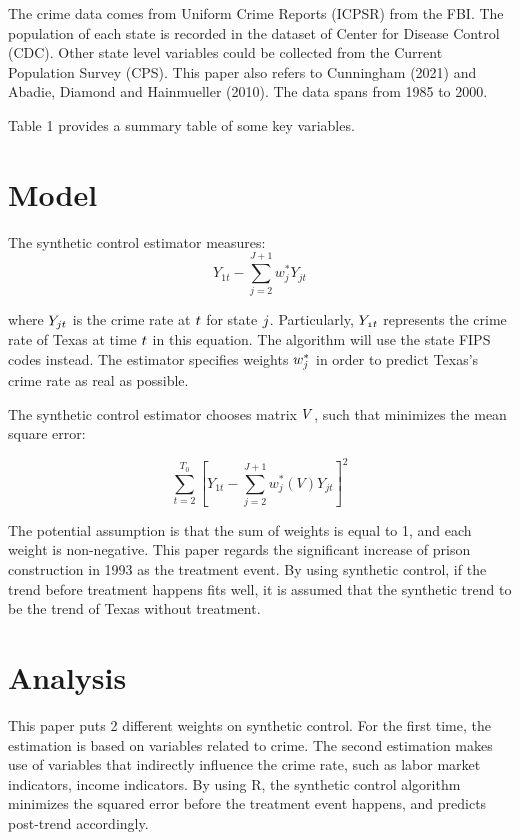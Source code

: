 \documentclass{article}
\begin{document}
The crime data comes from Uniform Crime Reports (ICPSR) from the FBI. The population of each state is recorded in the dataset of Center for Disease Control (CDC). Other state level variables could be collected from the Current Population Survey (CPS). This paper also refers to Cunningham (2021) and Abadie, Diamond and Hainmueller (2010). The data spans from 1985 to 2000.

Table 1 provides a summary table of some key variables. 



\section{Model}

The synthetic control estimator measures:
$$
    Y_{1t} - \sum_{j=2}^{J+1} w_j^* Y_{jt}
$$

where \( \mathnormal{Y_{jt}} \) is the crime rate at \( \mathnormal{t} \) for state \( \mathnormal{j} \). Particularly, \( \mathnormal{Y_{1t}} \) represents the crime rate of Texas at time \( \mathnormal{t} \) in this equation. The algorithm will use the state FIPS codes instead. The estimator specifies weights \( \mathnormal{w_j^*} \) in order to predict Texas's crime rate as real as possible. 

The synthetic control estimator chooses matrix \( \mathnormal{V} \), such that minimizes the mean square error:

$$
   \sum_{t=2}^{T_0} \left[Y_{1t} - \sum_{j=2}^{J+1} w_j^* (V) Y_{jt} \right]^2 
$$

The potential assumption is that the sum of weights is equal to 1, and each weight is non-negative. This paper regards the significant increase of prison construction in 1993 as the treatment event. By using synthetic control, if the trend before treatment happens fits well, it is assumed that the synthetic trend to be the trend of Texas without treatment. 
\newpage

\section{Analysis}

This paper puts 2 different weights on synthetic control. For the first time, the estimation is based on variables related to crime. The second estimation makes use of variables that indirectly influence the crime rate, such as labor market indicators, income indicators. By using R, the synthetic control algorithm minimizes the squared error before the treatment event happens, and predicts post-trend accordingly. 
\end{document}
